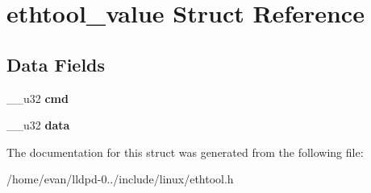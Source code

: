 \section{ethtool\-\_\-value \-Struct \-Reference}
\label{structethtool__value}
\subsection*{\-Data \-Fields}
\begin{DoxyCompactItemize}
\item 
\-\_\-\-\_\-u32 {\bfseries cmd}\label{structethtool__value_a66d231264d5aa36fd7d347e2c967769a}

\item 
\-\_\-\-\_\-u32 {\bfseries data}\label{structethtool__value_a7744ca69d2e0d7f55a6974d71016c624}

\end{DoxyCompactItemize}


\-The documentation for this struct was generated from the following file\-:\begin{DoxyCompactItemize}
\item 
/home/evan/lldpd-\/0../include/linux/ethtool.\-h\end{DoxyCompactItemize}
